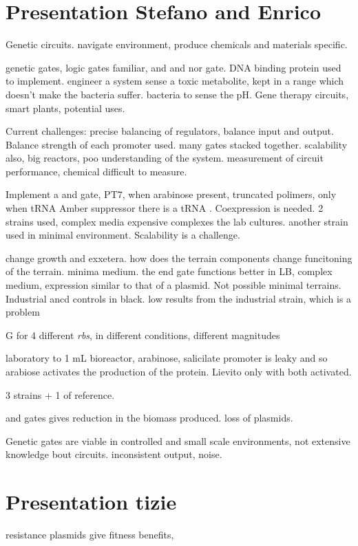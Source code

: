 \section{Presentation Stefano and Enrico}

Genetic circuits. navigate environment, produce chemicals and materials specific. 

genetic gates, logic gates familiar, and and nor gate. DNA binding protein used to implement. engineer a system sense a toxic metabolite, kept in a range which doesn't make the bacteria suffer.
bacteria to sense the pH.
Gene therapy circuits, smart plants, potential uses.

Current challenges: precise balancing of regulators, balance input and output. Balance strength of each promoter used. many gates stacked together. scalability also, big reactors, poo understanding of the system. measurement of circuit performance, chemical difficult to measure. 

Implement a and gate, PT7, when arabinose present, truncated polimers, only when tRNA Amber suppressor there is a tRNA . Coexpression is needed. 
2 strains used, complex media expensive complexes the lab cultures. another strain used in minimal environment. Scalability is a challenge. 

change growth and exxetera. how does the terrain components change funcitoning of the terrain. minima medium. the end gate functions better in LB, complex medium, expression similar to that of a plasmid. Not possible minimal terrains.
Industrial ancd controls in black. low results from the industrial strain, which is a problem

\delta G for 4 different \textit{rbs}, in different conditions, different magnitudes

laboratory to 1 mL bioreactor, 
arabinose, salicilate promoter is leaky and so arabiose activates the production of the protein.
Lievito only with both activated. 

3 strains + 1 of reference. 

and gates gives reduction in the biomass produced. 
loss of plasmids.

Genetic gates are viable in controlled and small scale environments, not extensive knowledge bout circuits. inconsistent output, noise. 

\section{Presentation tizie}
resistance plasmids give fitness benefits, 
